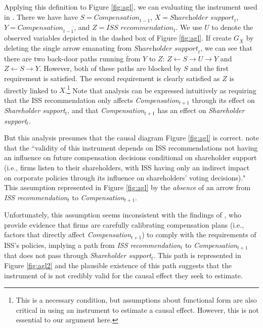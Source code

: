 \documentclass[11pt,reqno,titlepage]{amsart}
\begin{document}
Applying this definition to Figure \ref{fig:agl}, we can evaluating the instrument used in \citet{Armstrong:2013io}.
There we have have $S = \textit{Compensation}_{t-1}$,
$X =\textit{Shareholder support}_{t}$, $Y = \textit{Compensation}_{t-1}$, and $Z = \textit{ISS recommendation}_{t}$.
We use $U$ to denote the observed variables depicted in the dashed box of Figure \ref{fig:agl}.
If create $G_{\overline{X}}$ by deleting the single arrow emanating from $\textit{Shareholder support}_{t}$, we can see that there are two back-door paths running from $Y$ to $Z$: 
$Z \leftarrow S \rightarrow U \rightarrow Y$ and $Z \leftarrow S \rightarrow Y$.
However, both of these paths are blocked by $S$ and the first requirement is satisfied.
The second requirement is clearly satisfied as $Z$ is directly linked to $X$.\footnote{
This is a necessary condition, but assumptions about functional form are also critical in using an instrument to estimate a causal effect.
However, this is not essential to our argument here.}
%
Note that analysis can be expressed intuitively as requiring that the ISS recommendation only affects \textit{Compensation}$_{t+1}$ through its effect on \textit{Shareholder support}$_{t}$, and that \textit{Compensation}$_{t+1}$ has an effect on \textit{Shareholder support}$_{t}$.

But this analysis presumes that the causal diagram Figure \ref{fig:agl} is correct.
\citet[p.\,912]{Armstrong:2013io} note that the ``validity of this instrument depends on ISS recommendations not having an influence on future compensation decisions conditional on shareholder support (i.e., firms listen to their shareholders, with ISS having only an indirect impact on corporate policies through its influence on shareholders' voting decisions)."
This assumption represented in Figure \ref{fig:agl} by the \emph{absence} of an arrow from \textit{ISS recommendation}$_t$ to \textit{Compensation}$_{t+1}$.

Unfortunately, this assumption seems inconsistent with the findings of \citet{Gow:2013aa}, who provide evidence that firms are carefully calibrating compensation plans (i.e., factors that directly affect \textit{Compensation}$_{t+1}$) to comply with the requirements of ISS's policies, implying a path from \textit{ISS recommendation}$_t$ to \textit{Compensation}$_{t+1}$ that does not pass through \textit{Shareholder support}$_{t}$.
This path is represented in Figure \ref{fig:agl2} and the plausible existence of this path suggests that the instrument of \citet[p.\,912]{Armstrong:2013io} is not credibly valid for the causal effect they seek to estimate.
\end{document}

